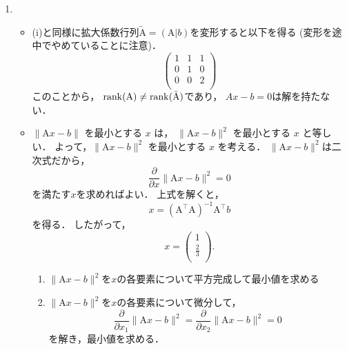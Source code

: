 \begin{enumerate}[label=(\roman*)]
    \item
    \begin{itemize}
      \item (i)と同様に拡大係数行列$\tilde{\mathrm{A}} = (\mathrm{A}|b)$を変形すると以下を得る
        (変形を途中でやめていることに注意)．
        \begin{equation}
          \left(
            \begin{array}{rr|r}
              1 & 1 & 1 \\
              0 & 1 & 0 \\
              0 & 0 & 2 \\
            \end{array}
          \right)
        \end{equation}
        このことから，
        $\operatorname{rank}(\mathrm{A}) \neq \operatorname{rank}(\tilde{\mathrm{A}})$であり，
        $Ax - b = 0$は解を持たない．
      \item $\|\mathrm{A}x-b\|$ を最小とする $x$ は，
      $\|\mathrm{A}x-b\|^2$ を最小とする $x$ と等しい．
      よって，$\|\mathrm{A}x-b\|^2$ を最小とする $x$ を考える．
      $\|\mathrm{A}x-b\|^2$は二次式だから，
      \begin{equation}
        \frac{\partial}{\partial x} \| \mathrm{A}x-b \|^2 = 0
      \end{equation}
      を満たす$x$を求めればよい．
      上式を解くと，
      \begin{equation}
        x = (\mathrm{A}^\top \mathrm{A})^{-1} \mathrm{A}^\top b
      \end{equation}
      を得る．
      したがって，
      \begin{equation}
        x = \left(
          \begin{array}{r}
             1 \\
             \frac{2}{3} \\
          \end{array}
          \right).
      \end{equation}
      \begin{enumerate}[label=別解\arabic*]
        \item $\|\mathrm{A}x-b\|^2$を$x$の各要素について平方完成して最小値を求める
        \item $\|\mathrm{A}x-b\|^2$を$x$の各要素について微分して，
          \begin{equation}
            \frac{\partial}{\partial x_1} \| \mathrm{A}x-b \|^2
            = \frac{\partial}{\partial x_2} \| \mathrm{A}x-b \|^2 = 0
          \end{equation}
          を解き，最小値を求める．
      \end{enumerate}
    \end{itemize}


\end{enumerate}

